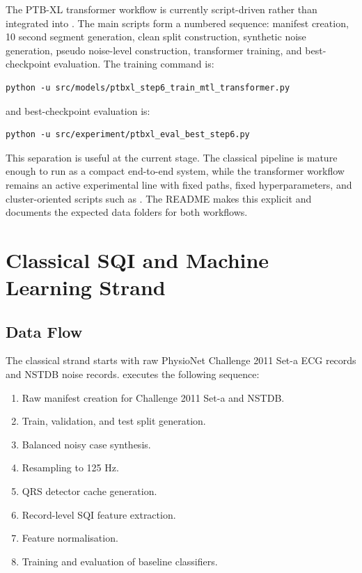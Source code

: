\documentclass[11pt,a4paper]{article}
\begin{document}
The PTB-XL transformer workflow is currently script-driven rather than integrated into . The main scripts form a numbered sequence: manifest creation, 10 second segment generation, clean split construction, synthetic noise generation, pseudo noise-level construction, transformer training, and best-checkpoint evaluation. The training command is:
\begin{verbatim}
python -u src/models/ptbxl_step6_train_mtl_transformer.py
\end{verbatim}
and best-checkpoint evaluation is:
\begin{verbatim}
python -u src/experiment/ptbxl_eval_best_step6.py
\end{verbatim}

This separation is useful at the current stage. The classical pipeline is mature enough to run as a compact end-to-end system, while the transformer workflow remains an active experimental line with fixed paths, fixed hyperparameters, and cluster-oriented scripts such as . The README makes this explicit and documents the expected data folders for both workflows.

\section{Classical SQI and Machine Learning Strand}

\subsection{Data Flow}

The classical strand starts with raw PhysioNet Challenge 2011 Set-a ECG records and NSTDB noise records.  executes the following sequence:
\begin{enumerate}
  \item Raw manifest creation for Challenge 2011 Set-a and NSTDB.
  \item Train, validation, and test split generation.
  \item Balanced noisy case synthesis.
  \item Resampling to 125 Hz.
  \item QRS detector cache generation.
  \item Record-level SQI feature extraction.
  \item Feature normalisation.
  \item Training and evaluation of baseline classifiers.
\end{enumerate}
\end{document}
